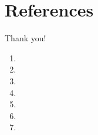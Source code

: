 \documentclass{beamer}%
\begin{document}
\section[References]{References}
\begin{frame}{ }
\begin{changemargin}
\footnotesize

\begin{minipage}[t][0.8715\textheight]{\linewidth}
\begin{center}
Thank you! \vspace{1.5ex}
\end{center}

\scriptsize
\begin{enumerate}

\item<1->[[1\text{]}] 
\item<1->[[2\text{]}] 
\item<1->[[3\text{]}] 
\item<1->[[4\text{]}] 
\item<1->[[5\text{]}] 
\item<1->[[6\text{]}] 
\item<1->[[7\text{]}] 



\end{enumerate}


\vspace{3ex}%
\end{minipage}



\end{changemargin}
\end{frame}
\end{document}
